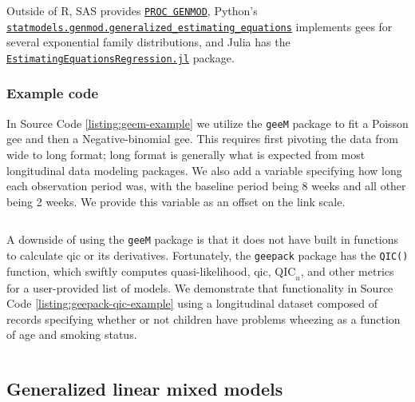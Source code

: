 \documentclass{report}
\begin{document}
Outside of R, SAS provides \href{https://support.sas.com/documentation/cdl/en/statug/63033/HTML/default/viewer.htm#genmod_toc.htm}{\texttt{PROC GENMOD}}, Python's \href{https://www.statsmodels.org/stable/gee.html}{\texttt{statmodels.genmod.generalized\_estimating\_equations}} implements \glspl{gee} for several exponential family distributions, and Julia has the \href{https://github.com/kshedden/EstimatingEquationsRegression.jl}{\texttt{EstimatingEquationsRegression.jl}} package. 

\subsubsection{Example code}

In Source Code \ref{listing:geem-example} we utilize the \texttt{geeM} package to fit a Poisson \gls{gee} and then a Negative-binomial \gls{gee}. This requires first pivoting the data from wide to long format; long format is generally what is expected from most longitudinal data modeling packages. We also add a variable specifying how long each observation period was, with the baseline period being 8 weeks and all other being 2 weeks. We provide this variable as an offset on the link scale. 

\begin{listing}[h!]
\inputminted{r}{Example-Code/geem_count_regression.R}
\caption{Fitting Poisson and Negative-binomial GEEs to the seizures dataset using \texttt{geeM}.}
\label{listing:geem-example}
\end{listing}

A downside of using the \texttt{geeM} package is that it does not have built in functions to calculate \gls{qic} or its derivatives. Fortunately, the \texttt{geepack} package has the \texttt{QIC()} function, which swiftly computes quasi-likelihood, \gls{qic}, $\text{QIC}_u$, and other metrics for a user-provided list of models. We demonstrate that functionality in Source Code \ref{listing:geepack-qic-example} using a longitudinal dataset composed of records specifying whether or not children have problems wheezing as a function of age and smoking status. 

\begin{listing}[h!]
\inputminted{r}{Example-Code/geepack_qic.R}
\caption{Choosing between correlation structures using QIC as implemented in \texttt{geepack}.}
\label{listing:geepack-qic-example}
\end{listing}

\subsection{Generalized linear mixed models}
\end{document}

